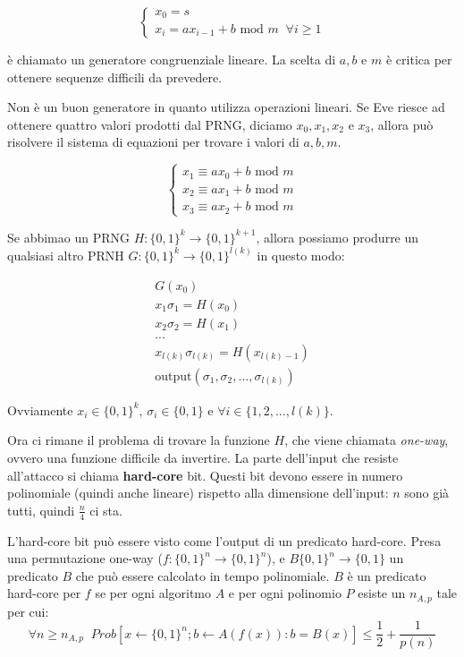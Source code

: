 \[
\begin{cases}
x_0 = s \\ 
x_i = ax_{i-1} + b \text { mod } m \; \; \forall i \geq 1
\end{cases}
\]

è chiamato un generatore congruenziale lineare.
La scelta di $a, b$ e $m$ è critica per ottenere sequenze difficili da prevedere.

Non è un buon generatore in quanto utilizza operazioni lineari. Se Eve riesce ad ottenere quattro valori prodotti dal PRNG, diciamo $x_0, x_1, x_2$ e $x_3$, allora può risolvere il sistema di equazioni per trovare i valori di $a, b, m$.

\[
\begin{cases}
x_1 \equiv ax_0 + b \text{ mod } m\\
x_2 \equiv ax_1 + b \text{ mod } m\\
x_3 \equiv ax_2 + b \text{ mod } m
\end{cases}
\]

Se abbimao un PRNG $H: \{0,1\}^k \rightarrow \{0,1\}^{k+1}$, allora possiamo produrre un qualsiasi altro PRNH $G:\{0,1\}^k \rightarrow \{0,1\}^{l(k)}$ in questo modo:

\begin{align*}
G(x_0)\\
x_1\sigma_1 = H(x_0)\\
x_2\sigma_2 = H(x_1)\\
...\\
x_{l(k)}\sigma_{l(k)} = H(x_{l(k)-1})\\
\text{output} (\sigma_1, \sigma_2, ..., \sigma_{l(k)})
\end{align*}

Ovviamente $x_i \in \{0,1\}^k$, $\sigma_i \in \{0,1\}$ e $\forall i \in \{1, 2, ..., l(k)\}$.

Ora ci rimane il problema di trovare la funzione $H$, che viene chiamata \textit{one-way}, ovvero una funzione difficile da invertire. La parte dell'input che resiste all'attacco si chiama \textbf{hard-core} bit. Questi bit devono essere in numero polinomiale (quindi anche lineare) rispetto alla dimensione dell'input: $n$ sono già tutti, quindi $\frac{n}{4}$ ci sta.


L'hard-core bit può essere visto come l'output di un predicato hard-core. Presa una permutazione one-way ($f: \{0,1\}^n \rightarrow \{0,1\}^n$), e $B\{0,1\}^n \rightarrow \{0,1\}$ un predicato $B$ che può essere calcolato in tempo polinomiale. $B$ è un predicato hard-core per $f$ se per ogni algoritmo $A$ e per ogni polinomio $P$ esiste un $n_{A,p}$ tale per cui:
\begin{equation*}
\forall n \geq n_{A,p} \;\; Prob[x \leftarrow \{0,1\}^n;  b \leftarrow A(f(x)) : b = B(x)] \leq \frac12 + \frac1{p(n)}
\end{equation*}

